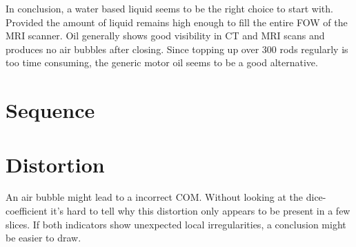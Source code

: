 In conclusion, a water based liquid seems to be the right choice to start with.
Provided the amount of liquid remains high enough to fill the entire FOW of the MRI scanner.
Oil generally shows good visibility in CT and MRI scans and produces no air bubbles after closing.
Since topping up over 300 rods regularly is too time consuming, the generic motor oil seems to be a good alternative.

\section{Sequence}

\section{Distortion}


An air bubble might lead to a incorrect COM. Without looking at the dice-coefficient it's hard to tell why this distortion only appears to be present in a few slices.
If both indicators show unexpected local irregularities, a conclusion might be easier to draw.

